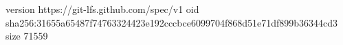 version https://git-lfs.github.com/spec/v1
oid sha256:31655a65487f74763324423e192cccbce6099704f868d51e71df899b36344cd3
size 71559
